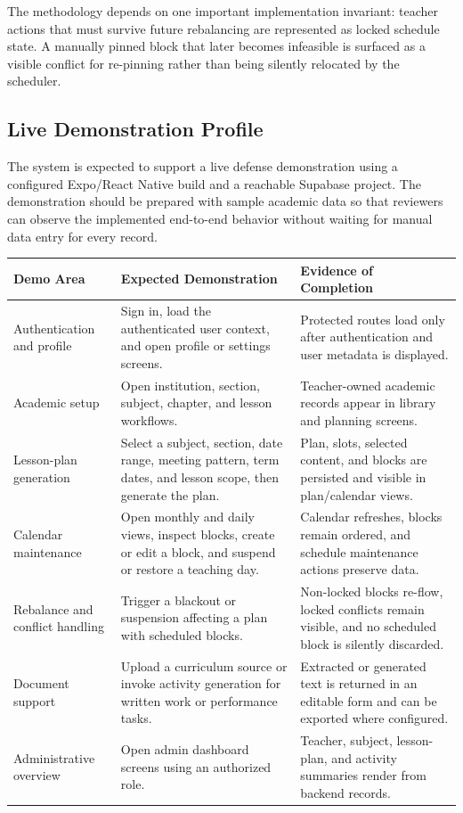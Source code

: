 \documentclass[12pt]{article}
\begin{document}
The methodology depends on one important implementation invariant: teacher
actions that must survive future rebalancing are represented as locked schedule
state. A manually pinned block that later becomes infeasible is surfaced as a
visible conflict for re-pinning rather than being silently relocated by the
scheduler.

\subsection{Live Demonstration Profile}

The system is expected to support a live defense demonstration using a configured
Expo/React Native build and a reachable Supabase project. The demonstration
should be prepared with sample academic data so that reviewers can observe the
implemented end-to-end behavior without waiting for manual data entry for every
record.

\begin{longtable}{|L{3.1cm}|L{5.3cm}|L{5.0cm}|}
\hline
\textbf{Demo Area} & \textbf{Expected Demonstration} & \textbf{Evidence of Completion} \\
\hline
Authentication and profile & Sign in, load the authenticated user context, and open profile or settings screens. & Protected routes load only after authentication and user metadata is displayed. \\
\hline
Academic setup & Open institution, section, subject, chapter, and lesson workflows. & Teacher-owned academic records appear in library and planning screens. \\
\hline
Lesson-plan generation & Select a subject, section, date range, meeting pattern, term dates, and lesson scope, then generate the plan. & Plan, slots, selected content, and blocks are persisted and visible in plan/calendar views. \\
\hline
Calendar maintenance & Open monthly and daily views, inspect blocks, create or edit a block, and suspend or restore a teaching day. & Calendar refreshes, blocks remain ordered, and schedule maintenance actions preserve data. \\
\hline
Rebalance and conflict handling & Trigger a blackout or suspension affecting a plan with scheduled blocks. & Non-locked blocks re-flow, locked conflicts remain visible, and no scheduled block is silently discarded. \\
\hline
Document support & Upload a curriculum source or invoke activity generation for written work or performance tasks. & Extracted or generated text is returned in an editable form and can be exported where configured. \\
\hline
Administrative overview & Open admin dashboard screens using an authorized role. & Teacher, subject, lesson-plan, and activity summaries render from backend records. \\
\hline
\end{longtable}
\end{document}
